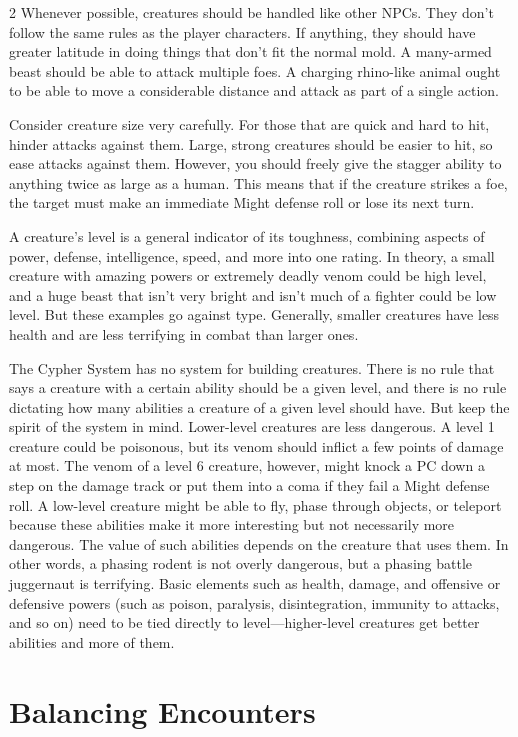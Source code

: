 \begin{multicols}{2}
Whenever possible, creatures should be handled like other NPCs. They don’t follow the same rules as the player characters. If anything, they should have greater latitude in doing things that don’t fit the normal mold. A many-armed beast should be able to attack multiple foes. A charging rhino-like animal ought to be able to move a considerable distance and attack as part of a single action.

Consider creature size very carefully. For those that are quick and hard to hit, hinder attacks against them. Large, strong creatures should be easier to hit, so ease attacks against them. However, you should freely give the stagger ability to anything twice as large as a human. This means that if the creature strikes a foe, the target must make an immediate Might defense roll or lose its next turn.

A creature’s level is a general indicator of its toughness, combining aspects of power, defense, intelligence, speed, and more into one rating. In theory, a small creature with amazing powers or extremely deadly venom could be high level, and a huge beast that isn’t very bright and isn’t much of a fighter could be low level. But these examples go against type. Generally, smaller creatures have less health and are less terrifying in combat than larger ones.

The Cypher System has no system for building creatures. There is no rule that says a creature with a certain ability should be a given level, and there is no rule dictating how many abilities a creature of a given level should have. But keep the spirit of the system in mind. Lower-level creatures are less dangerous. A level 1 creature could be poisonous, but its venom should inflict a few points of damage at most. The venom of a level 6 creature, however, might knock a PC down a step on the damage track or put them into a coma if they fail a Might defense roll. A low-level creature might be able to fly, phase through objects, or teleport because these abilities make it more interesting but not necessarily more dangerous. The value of such abilities depends on the creature that uses them. In other words, a phasing rodent is not overly dangerous, but a phasing battle juggernaut is terrifying. Basic elements such as health, damage, and offensive or defensive powers (such as poison, paralysis, disintegration, immunity to attacks, and so on) need to be tied directly to level—higher-level creatures get better abilities and more of them.

\chapter{Balancing Encounters}


\end{multicols}
